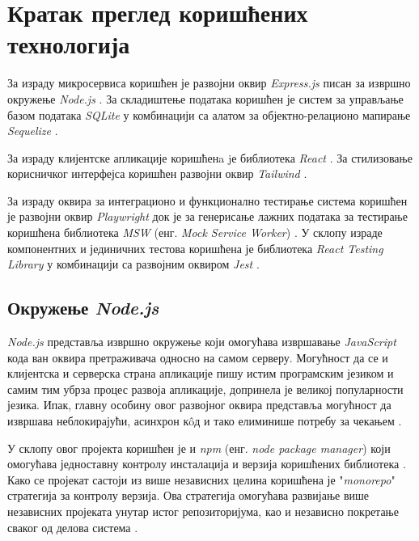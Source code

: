 \documentclass[12pt,oneside]{memoir}
\begin{document}
\section{Кратак преглед коришћених технологија}
\label{chp:tehnologije}

За израду микросервиса коришћен је развојни оквир \textit{Express.js} \cite{express} писан за извршно окружење \textit{Node.js} \cite{nodejs}. За складиштење података коришћен је систем за управљање базом података \textit{SQLite} \cite{sqlite} у комбинацији са алатом за објектно-релационо мапирање \textit{Sequelize} \cite{sequelize}. 

За израду клијентске апликације коришћенa jе библиотека \textit{React} \cite{react}. За стилизовање корисничког интерфејса коришћен развојни оквир \textit{Tailwind} \cite{tailwind}. 

За израду оквира за интеграционо и функционално тестирање система коришћен је развојни оквир \textit{Playwright} \cite{playwright} док је за генерисање лажних података за тестирање коришћена библиотека \textit{MSW} (енг. \textit{Mock Service Worker}) \cite{msw}. У склопу израде компонентних и јединичних тестова коришћена је библиотека \textit{React Testing Library} \cite{rtl} у комбинацији са развојним оквиром \textit{Jest} \cite{jest}.

\subsection{Окружење \textit{Node.js}}

\textit{Node.js} представља извршно окружење који омогућава извршавање \textit{JavaScript} кода ван оквира претраживача односно на самом серверу. Могућност да се и клијентска и серверска страна апликације пишу истим програмским језиком и самим тим убрза процес развоја апликације, допринела је великој популарности језика.
Ипак, главну особину овог развојног оквира представља могућност да извршава неблокирајући, асинхрон к\^{o}д и тако елиминише потребу за чекањем  \cite{w3nodejs}.

У склопу овог пројекта коришћен је и \textit{npm} (енг. \textit{node package manager}) који омогућава једноставну контролу инсталација и верзија коришћених библиотека \cite{npm}. Како се пројекат састоји из више независних целина коришћена је "\textit{monorepo}" стратегија за контролу верзија. Ова стратегија омогућава развијање више независних пројеката унутар истог репозиторијума, као и независно покретање сваког од делова система \cite{monorepo}.
\end{document}
